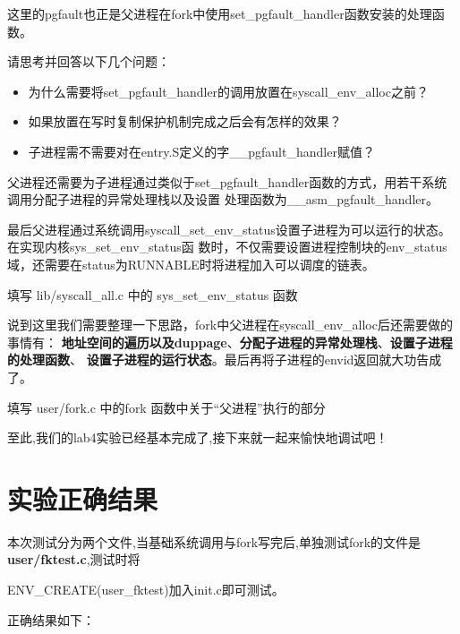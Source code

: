 这里的pgfault也正是父进程在fork中使用set\_pgfault\_handler函数安装的处理函数。

\begin{thinking}\label{think:pgfault-user-2}
请思考并回答以下几个问题：
\begin{itemize}
  \item 为什么需要将set\_pgfault\_handler的调用放置在syscall\_env\_alloc之前？
  \item 如果放置在写时复制保护机制完成之后会有怎样的效果？
  \item 子进程需不需要对在entry.S定义的字\_\_pgfault\_handler赋值？
\end{itemize}
\end{thinking}

父进程还需要为子进程通过类似于set\_pgfault\_handler函数的方式，用若干系统调用分配子进程的异常处理栈以及设置
处理函数为\_\_asm\_pgfault\_handler。

最后父进程通过系统调用syscall\_set\_env\_status设置子进程为可以运行的状态。在实现内核sys\_set\_env\_status函
数时，不仅需要设置进程控制块的env\_status域，还需要在status为RUNNABLE时将进程加入可以调度的链表。

\begin{exercise}
填写 lib/syscall\_all.c 中的 sys\_set\_env\_status 函数
\end{exercise}

说到这里我们需要整理一下思路，fork中父进程在syscall\_env\_alloc后还需要做的事情有：
\textbf{地址空间的遍历以及duppage}、\textbf{分配子进程的异常处理栈}、\textbf{设置子进程的处理函数}、
\textbf{设置子进程的运行状态}。最后再将子进程的envid返回就大功告成了。

\begin{exercise}
 填写 user/fork.c 中的fork 函数中关于“父进程”执行的部分
\end{exercise}

至此,我们的lab4实验已经基本完成了,接下来就一起来愉快地调试吧！

\section{实验正确结果}

本次测试分为两个文件,当基础系统调用与fork写完后,单独测试fork的文件是\textbf{user/fktest.c},测试时将

ENV\_CREATE(user\_fktest)加入init.c即可测试。

正确结果如下：

